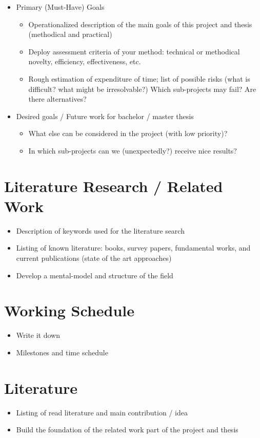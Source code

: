 \documentclass[11pt,a4paper]{article}
\begin{document}
\begin{itemize}

\item Primary (Must-Have) Goals
    \begin{itemize}
        \item Operationalized description of the main goals of this project and thesis (methodical and practical)
        \item Deploy assessment criteria of your method: technical or methodical novelty, efficiency, effectiveness, etc.
        \item Rough estimation of expenditure of time; list of possible risks (what is difficult? what might be irresolvable?) Which sub-projects may fail? Are there alternatives?
    \end{itemize}
    
\item Desired goals / Future work for bachelor / master thesis
    \begin{itemize}
        \item What else can be considered in the project (with low priority)?
        \item In which sub-projects can we (unexpectedly?) receive nice results?
    \end{itemize}
\end{itemize}



\section{Literature Research / Related Work}

\begin{itemize}
\item Description of keywords used for the literature search
\item Listing of known literature: books, survey papers, fundamental works, and current publications (state of the art approaches)
\item Develop a mental-model and structure of the field
\end{itemize}

\section{Working Schedule}

\begin{itemize}
\item Write it down
\item Milestones and time schedule
\end{itemize}

	
\section{Literature}

\begin{itemize}
\item Listing of read literature and main contribution / idea
\item Build the foundation of the related work part of the project and thesis
\end{itemize}
\end{document}
